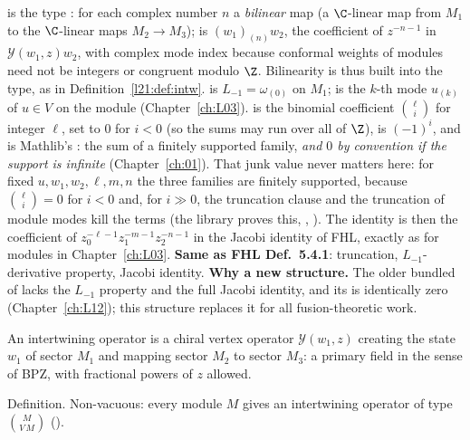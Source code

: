 \begin{dictionary}
 is the type : for each complex number $n$ a
\emph{bilinear} map (a $\C$-linear map from $M_1$ to the $\C$-linear maps $M_2\to M_3$);  is
$(w_1)_{(n)}w_2$, the coefficient of $z^{-n-1}$ in $\mathcal Y(w_1,z)w_2$, with complex mode index because conformal
weights of modules need not be integers or congruent modulo $\Z$. Bilinearity is thus built into the type, as in
Definition~\ref{l21:def:intw}.  is $L_{-1}=\omega_{(0)}$ on $M_1$;  is the $k$-th mode
$u_{(k)}$ of $u\in V$ on the module (Chapter~\ref{ch:L03}).
 is the binomial coefficient $\binom{\ell}{i}$ for integer $\ell$, set to $0$ for $i<0$ (so the sums may
run over all of $\Z$),  is $(-1)^i$, and  is Mathlib's : the sum of a finitely
supported family, \emph{and $0$ by convention if the support is infinite} (Chapter~\ref{ch:01}). That junk value never
matters here: for fixed $u,w_1,w_2,\ell,m,n$ the three families are finitely supported, because $\binom{\ell}{i}=0$ for
$i<0$ and, for $i\gg0$, the truncation clause and the truncation of module modes kill the terms (the library proves
this, , ). The identity is then the coefficient of
$z_0^{-\ell-1}z_1^{-m-1}z_2^{-n-1}$ in the Jacobi identity of FHL, exactly as for modules in
Chapter~\ref{ch:L03}. \textbf{Same as FHL Def.~5.4.1}: truncation, $L_{-1}$-derivative property, Jacobi identity. \textbf{Why a new structure.} The older bundled  of
 lacks the $L_{-1}$ property and the full Jacobi identity, and its  is
identically zero (Chapter~\ref{ch:L12}); this structure replaces it for all fusion-theoretic work.
\end{dictionary}

\begin{physics}
An intertwining operator is a chiral vertex operator $\mathcal Y(w_1,z)$ creating the state $w_1$ of sector $M_1$ and
mapping sector $M_2$ to sector $M_3$: a primary field in the sense of BPZ, with fractional powers of $z$ allowed.
\end{physics}

\begin{status}
Definition. Non-vacuous: every module $M$ gives an intertwining operator of type $\binom{M}{V\,M}$
().
\end{status}

